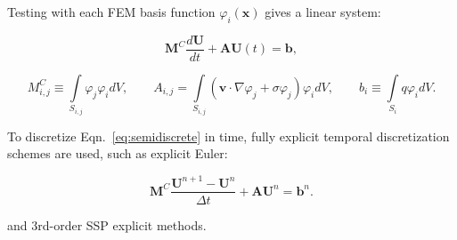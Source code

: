 Testing with each FEM basis function $\varphi_i(\mathbf{x})$ gives a linear system:

\begin{equation}\label{eq:semidiscrete}
      \mathbf{M}^C\frac{d\mathbf{U}}{dt}+\mathbf{A} \mathbf{U}(t) = \mathbf{b},
\end{equation}

\begin{equation}
	M^C_{i,j} \equiv \int\limits_{S_{i,j}}
    \varphi_j\varphi_i dV, \qquad
  A_{i,j} = \int\limits_{S_{i,j}}\left(
   \mathbf{v}\cdot\nabla\varphi_j +
   \sigma\varphi_j\right)\varphi_i dV, \qquad
	b_i \equiv \int\limits_{S_i} q\varphi_i dV.
\end{equation}

To discretize Eqn.~\ref{eq:semidiscrete} in time, fully explicit
temporal discretization schemes are used, such as explicit Euler:

\begin{equation}\label{eq:exgalerkin}
   \mathbf{M}^C\frac{\mathbf{U}^{n+1}-\mathbf{U}^n}{\Delta t}
     + \mathbf{A}\mathbf{U}^n = \mathbf{b}^n.
\end{equation}

and 3rd-order SSP explicit methods.
